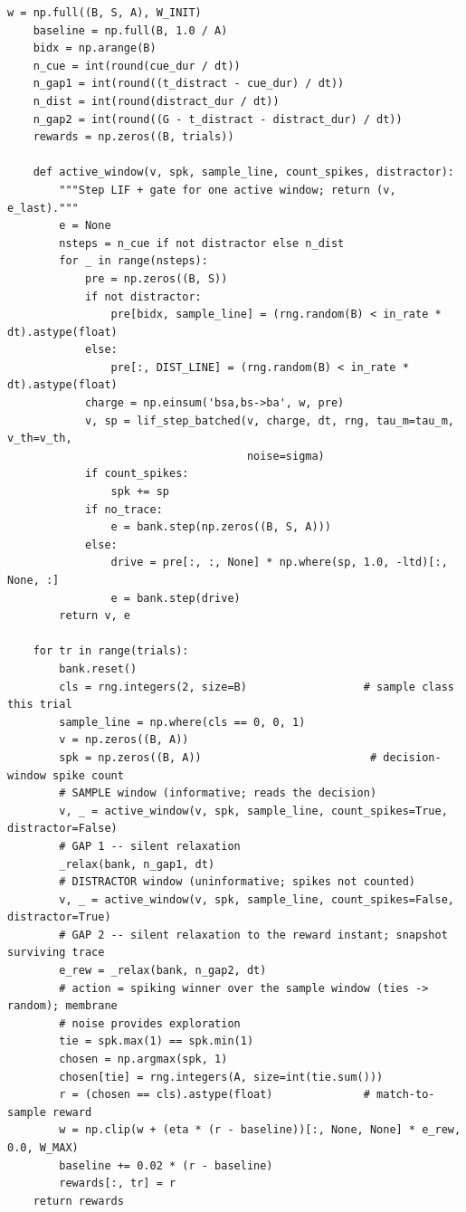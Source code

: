 \begin{lstlisting}[caption={mrl\_trace/deep.py},label={lst:siox-src-deep}]
    w = np.full((B, S, A), W_INIT)
    baseline = np.full(B, 1.0 / A)
    bidx = np.arange(B)
    n_cue = int(round(cue_dur / dt))
    n_gap1 = int(round((t_distract - cue_dur) / dt))
    n_dist = int(round(distract_dur / dt))
    n_gap2 = int(round((G - t_distract - distract_dur) / dt))
    rewards = np.zeros((B, trials))

    def active_window(v, spk, sample_line, count_spikes, distractor):
        """Step LIF + gate for one active window; return (v, e_last)."""
        e = None
        nsteps = n_cue if not distractor else n_dist
        for _ in range(nsteps):
            pre = np.zeros((B, S))
            if not distractor:
                pre[bidx, sample_line] = (rng.random(B) < in_rate * dt).astype(float)
            else:
                pre[:, DIST_LINE] = (rng.random(B) < in_rate * dt).astype(float)
            charge = np.einsum('bsa,bs->ba', w, pre)
            v, sp = lif_step_batched(v, charge, dt, rng, tau_m=tau_m, v_th=v_th,
                                     noise=sigma)
            if count_spikes:
                spk += sp
            if no_trace:
                e = bank.step(np.zeros((B, S, A)))
            else:
                drive = pre[:, :, None] * np.where(sp, 1.0, -ltd)[:, None, :]
                e = bank.step(drive)
        return v, e

    for tr in range(trials):
        bank.reset()
        cls = rng.integers(2, size=B)                  # sample class this trial
        sample_line = np.where(cls == 0, 0, 1)
        v = np.zeros((B, A))
        spk = np.zeros((B, A))                          # decision-window spike count
        # SAMPLE window (informative; reads the decision)
        v, _ = active_window(v, spk, sample_line, count_spikes=True, distractor=False)
        # GAP 1 -- silent relaxation
        _relax(bank, n_gap1, dt)
        # DISTRACTOR window (uninformative; spikes not counted)
        v, _ = active_window(v, spk, sample_line, count_spikes=False, distractor=True)
        # GAP 2 -- silent relaxation to the reward instant; snapshot surviving trace
        e_rew = _relax(bank, n_gap2, dt)
        # action = spiking winner over the sample window (ties -> random); membrane
        # noise provides exploration
        tie = spk.max(1) == spk.min(1)
        chosen = np.argmax(spk, 1)
        chosen[tie] = rng.integers(A, size=int(tie.sum()))
        r = (chosen == cls).astype(float)              # match-to-sample reward
        w = np.clip(w + (eta * (r - baseline))[:, None, None] * e_rew, 0.0, W_MAX)
        baseline += 0.02 * (r - baseline)
        rewards[:, tr] = r
    return rewards



\end{lstlisting}
